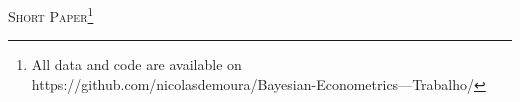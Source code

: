 \documentclass[12pt]{article}
\begin{document}
\null
\vspace{-1cm}
\begin{center}\LARGE \textsc{Short Paper}\footnote{All data and code are available on https://github.com/nicolasdemoura/Bayesian-Econometrics---Trabalho/} \end{center}

 
  
 




\end{document}

